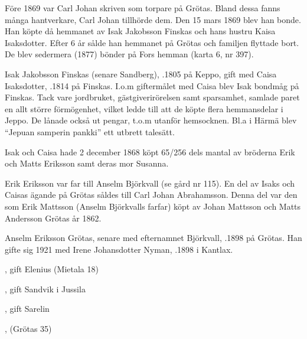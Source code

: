 Före 1869 var Carl Johan skriven som torpare på Grötas. Bland dessa fanns många hantverkare, Carl Johan tillhörde dem. Den 15 mars 1869 blev han bonde. Han köpte då hemmanet av Isak Jakobsson Finskas och hans hustru Kaisa Isaksdotter. Efter 6 år sålde han hemmanet på Grötas och familjen flyttade bort. De blev sedermera (1877) bönder på Fors hemman (karta 6, nr 397).


%
Isak Jakobsson Finskas (senare Sandberg), .1805 på Keppo, gift med Caisa Isaksdotter, .1814 på Finskas. I.o.m giftermålet med Caisa blev Isak bondmåg på Finskas. Tack vare jordbruket, gästgiverirörelsen samt sparsamhet, samlade paret en allt större förmögenhet, vilket ledde till att de köpte flera hemmansdelar i Jeppo. De lånade också ut pengar, t.o.m utanför hemsocknen. Bl.a i Härmä blev ``Jepuan samperin pankki'' ett utbrett talesätt.

Isak och Caisa hade 2 december 1868 köpt 65/256 dels mantal av bröderna Erik och Matts Eriksson samt deras mor Susanna.


%
Erik Eriksson var far till Anselm Björkvall (se gård nr 115). En del av Isaks och Caisas ägande på Grötas såldes till Carl Johan Abrahamsson. Denna del var den som Erik Mattsson (Anselm Björkvalls farfar) köpt av Johan Mattsson och Matts Andersson Grötas år 1862.



%


%
Anselm Eriksson Grötas, senare med efternamnet Björkvall, .1898 på Grötas. Han gifte sig 1921 med Irene Johansdotter Nyman, .1898 i Kantlax.
\begin{jhchildren}
  \item {}, gift Elenius (Mietala 18)
  \item {}, gift Sandvik i Jussila
  \item {}, gift Sarelin
  \item {}, (Grötas 35)
\end{jhchildren}


